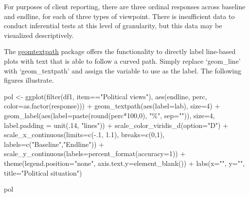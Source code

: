 \documentclass[
  letterpaper,
  DIV=11,
  numbers=noendperiod]{scrreprt}
\newenvironment{Shaded}{\begin{snugshade}}{\end{snugshade}}
\newcommand{\AttributeTok}[1]{\textcolor[rgb]{0.40,0.45,0.13}{#1}}
\newcommand{\DecValTok}[1]{\textcolor[rgb]{0.68,0.00,0.00}{#1}}
\newcommand{\FloatTok}[1]{\textcolor[rgb]{0.68,0.00,0.00}{#1}}
\newcommand{\FunctionTok}[1]{\textcolor[rgb]{0.28,0.35,0.67}{#1}}
\newcommand{\NormalTok}[1]{\textcolor[rgb]{0.00,0.23,0.31}{#1}}
\newcommand{\OtherTok}[1]{\textcolor[rgb]{0.00,0.23,0.31}{#1}}
\newcommand{\SpecialCharTok}[1]{\textcolor[rgb]{0.37,0.37,0.37}{#1}}
\newcommand{\StringTok}[1]{\textcolor[rgb]{0.13,0.47,0.30}{#1}}
\begin{document}
\renewcommand*{\arraystretch}{1}

For purposes of client reporting, there are three ordinal responses
across baseline and endline, for each of three types of viewpoint. There
is insufficient data to conduct inferential tests at this level of
granularity, but this data may be visualized descriptively.

The
\href{https://cran.r-project.org/web/packages/geomtextpath/vignettes/geomtextpath.html}{geomtextpath}
package offers the functionality to directly label line-based plots with
text that is able to follow a curved path. Simply replace `geom\_line'
with `geom\_textpath' and assign the variable to use as the label. The
following figures illustrate.

\begin{Shaded}
\begin{Highlighting}[]
\NormalTok{pol }\OtherTok{\textless{}{-}} \FunctionTok{ggplot}\NormalTok{(}\FunctionTok{filter}\NormalTok{(df1, item}\SpecialCharTok{==}\StringTok{"Political views"}\NormalTok{), }\FunctionTok{aes}\NormalTok{(endline, perc, }\AttributeTok{color=}\FunctionTok{as.factor}\NormalTok{(response))) }\SpecialCharTok{+} 
  \FunctionTok{geom\_textpath}\NormalTok{(}\FunctionTok{aes}\NormalTok{(}\AttributeTok{label=}\NormalTok{lab),}
                \AttributeTok{size=}\DecValTok{4}\NormalTok{) }\SpecialCharTok{+}
  \FunctionTok{geom\_label}\NormalTok{(}\FunctionTok{aes}\NormalTok{(}\AttributeTok{label=}\FunctionTok{paste}\NormalTok{(}\FunctionTok{round}\NormalTok{(perc}\SpecialCharTok{*}\DecValTok{100}\NormalTok{,}\DecValTok{0}\NormalTok{), }\StringTok{"\%"}\NormalTok{, }\AttributeTok{sep=}\StringTok{""}\NormalTok{)),}
             \AttributeTok{size=}\DecValTok{4}\NormalTok{,}
             \AttributeTok{label.padding =} \FunctionTok{unit}\NormalTok{(.}\DecValTok{14}\NormalTok{, }\StringTok{"lines"}\NormalTok{)) }\SpecialCharTok{+}
  \FunctionTok{scale\_color\_viridis\_d}\NormalTok{(}\AttributeTok{option=}\StringTok{"D"}\NormalTok{) }\SpecialCharTok{+}
  \FunctionTok{scale\_x\_continuous}\NormalTok{(}\AttributeTok{limits=}\FunctionTok{c}\NormalTok{(}\SpecialCharTok{{-}}\NormalTok{.}\DecValTok{1}\NormalTok{, }\FloatTok{1.1}\NormalTok{),}
                     \AttributeTok{breaks=}\FunctionTok{c}\NormalTok{(}\DecValTok{0}\NormalTok{,}\DecValTok{1}\NormalTok{),}
                     \AttributeTok{labels=}\FunctionTok{c}\NormalTok{(}\StringTok{"Baseline"}\NormalTok{,}\StringTok{"Endline"}\NormalTok{)) }\SpecialCharTok{+}
  \FunctionTok{scale\_y\_continuous}\NormalTok{(}\AttributeTok{labels=}\FunctionTok{percent\_format}\NormalTok{(}\AttributeTok{accuracy=}\DecValTok{1}\NormalTok{)) }\SpecialCharTok{+}
  \FunctionTok{theme}\NormalTok{(}\AttributeTok{legend.position=}\StringTok{"none"}\NormalTok{,}
        \AttributeTok{axis.text.y=}\FunctionTok{element\_blank}\NormalTok{()) }\SpecialCharTok{+}
  \FunctionTok{labs}\NormalTok{(}\AttributeTok{x=}\StringTok{""}\NormalTok{,}
       \AttributeTok{y=}\StringTok{""}\NormalTok{,}
       \AttributeTok{title=}\StringTok{"Political situation"}\NormalTok{) }

\NormalTok{pol}
\end{Highlighting}
\end{Shaded}
\end{document}
